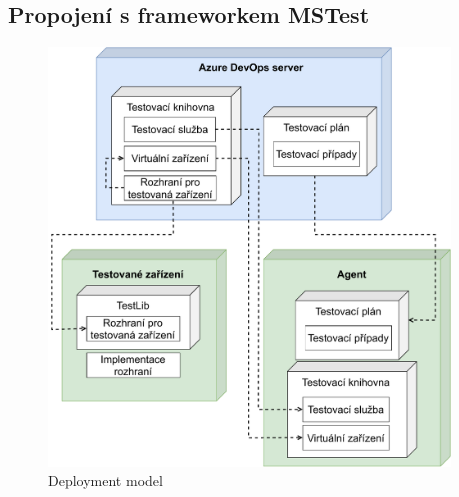 \subsection{Propojení s frameworkem MSTest}


\begin{figure}[htbp]
    \centering 
    \includegraphics[width=0.95\textwidth]{assets/img/deploymentmodel.pdf}
    \caption{Deployment model}
    \label{fig:deploymodel}
\end{figure}